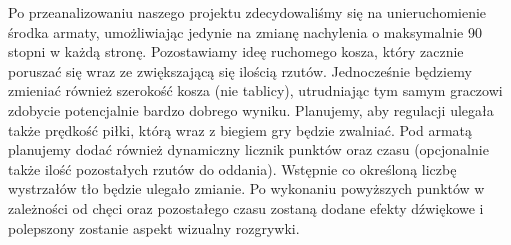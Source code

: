 \documentclass{article}
\begin{document}
\smallskip
\large Po przeanalizowaniu naszego projektu zdecydowaliśmy się na unieruchomienie środka armaty, umożliwiając jedynie na zmianę nachylenia o maksymalnie 90 stopni w każdą stronę. Pozostawiamy ideę ruchomego kosza, który zacznie poruszać się wraz ze zwiększającą się ilością rzutów. Jednocześnie będziemy zmieniać również szerokość kosza (nie tablicy), utrudniając tym samym graczowi zdobycie potencjalnie bardzo dobrego wyniku. Planujemy, aby regulacji ulegała także prędkość piłki, którą wraz z biegiem gry będzie zwalniać. Pod armatą planujemy dodać również dynamiczny licznik punktów oraz czasu (opcjonalnie także ilość pozostałych rzutów do oddania). Wstępnie co określoną liczbę wystrzałów tło będzie ulegało zmianie. Po wykonaniu powyższych punktów w zależności od chęci oraz pozostałego czasu zostaną dodane efekty dźwiękowe i polepszony zostanie aspekt wizualny rozgrywki.  \\
\end{document}
